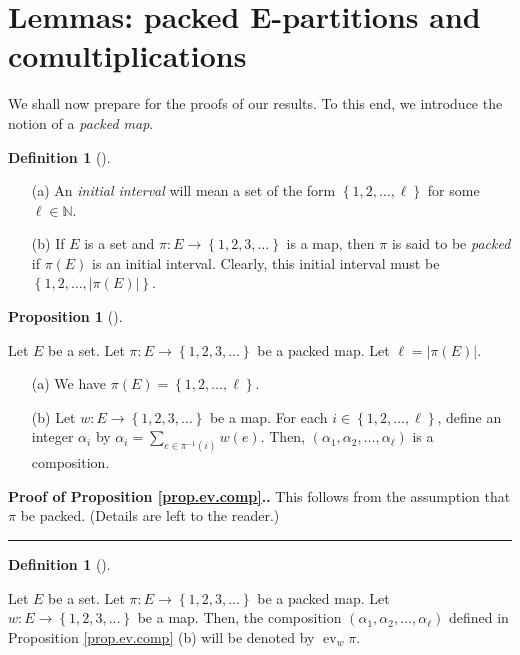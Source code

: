 \documentclass[numbers=enddot,12pt,final,onecolumn,notitlepage,abstracton]{scrartcl}%
\theoremstyle{definition}
\newtheorem{prop}[theo]{Proposition}
\newenvironment{proposition}[1][]
{\begin{prop}[#1]\begin{leftbar}}
{\end{leftbar}\end{prop}}
\newtheorem{defi}[theo]{Definition}
\newenvironment{definition}[1][]
{\begin{defi}[#1]\begin{leftbar}}
{\end{leftbar}\end{defi}}
\newenvironment{proof}[1][Proof]{\noindent\textbf{#1.} }{\ \rule{0.5em}{0.5em}}
\let\sumnonlimits\sum
\renewcommand{\sum}{\sumnonlimits\limits}
\newcommand{\ev}{\operatorname{ev}}
\newcommand{\EE}{{\mathbf{E}}}
\newcommand{\NN}{{\mathbb{N}}}
\begin{document}
\section{Lemmas: packed $\EE$-partitions and comultiplications}
\label{sect.lemmas}

We shall now prepare for the proofs of our results. To this end,
we introduce the notion of a \textit{packed map}.

\begin{definition}
\begin{itemize}

\item[(a)]
An \textit{initial interval} will mean a set of the form
$\left\{1, 2, \ldots, \ell\right\}$ for some $\ell \in \NN$.

\item[(b)]
If $E$ is a set and $\pi : E \to \left\{1, 2, 3, \ldots\right\}$ is
a map, then $\pi$ is said to be \textit{packed} if $\pi\left(E\right)$
is an initial interval. Clearly, this initial interval must be
$\left\{1, 2, \ldots, \left|\pi\left(E\right)\right|\right\}$.

\end{itemize}
\end{definition}

\begin{proposition}
\label{prop.ev.comp}
Let $E$ be a set.
Let $\pi : E \to \left\{1, 2, 3, \ldots\right\}$ be a packed map.
Let $\ell = \left|\pi\left(E\right)\right|$.

\begin{itemize}
\item[(a)] We have $\pi\left(E\right) = \left\{1, 2, \ldots, \ell\right\}$.

\item[(b)] Let $w : E \to \left\{1, 2, 3, \ldots\right\}$ be a
map. For each $i \in \left\{1, 2, \ldots, \ell\right\}$, define an
integer $\alpha_i$ by $\alpha_i = \sum_{e \in \pi^{-1}\left(i\right)}
w\left(e\right)$. Then,
$\left(\alpha_1, \alpha_2, \ldots, \alpha_\ell\right)$ is a
composition.
\end{itemize}
\end{proposition}

\begin{proof}[Proof of Proposition \ref{prop.ev.comp}.]
This follows from the assumption that $\pi$ be packed. (Details
are left to the reader.)
\end{proof}

\begin{definition}
Let $E$ be a set.
Let $\pi : E \to \left\{1, 2, 3, \ldots\right\}$ be a packed map.
Let $w : E \to \left\{1, 2, 3, \ldots\right\}$ be a map. Then, the
composition $\left(\alpha_1, \alpha_2, \ldots, \alpha_\ell\right)$
defined in Proposition \ref{prop.ev.comp} (b) will be denoted by
$\ev_w \pi$.
\end{definition}
\end{document}
